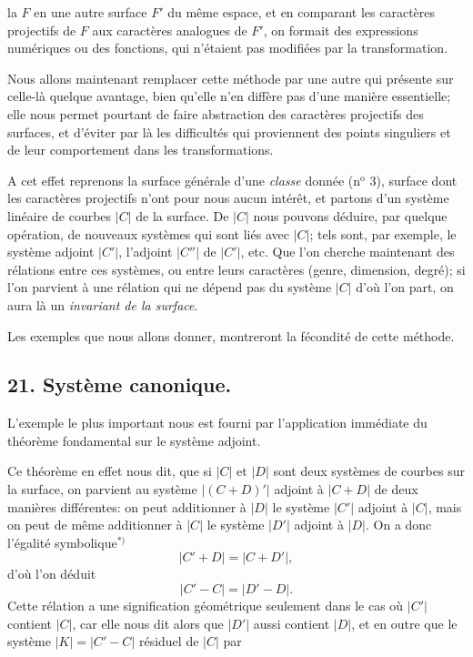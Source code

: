 \documentclass{article}
\begin{document}
la $F$ en une autre surface $F'$ du même espace, et en comparant les caractères projectifs de $F$ aux caractères analogues de $F'$, on formait des expressions numériques ou des fonctions, qui n'étaient pas modifiées par la transformation.

Nous allons maintenant remplacer cette méthode par une autre qui présente sur celle-là quelque avantage, bien qu'elle n'en diffère pas d'une manière essentielle; elle nous permet pourtant de faire abstraction des caractères projectifs des surfaces, et d'éviter par là les difficultés qui proviennent des points singuliers et de leur comportement dans les transformations.

A cet effet reprenons la surface générale d'une \emph{classe} donnée (n${}^{\text{o}}$ 3), surface dont les caractères projectifs n'ont pour nous aucun intérêt, et partons d'un système linéaire de courbes $|C|$ de la surface. De $|C|$ nous pouvons déduire, par quelque opération, de nouveaux systèmes qui sont liés avec $|C|$; tels sont, par exemple, le système adjoint $|C'|$, l'adjoint $|C''|$ de $|C'|$, etc. Que l'on cherche maintenant des rélations entre ces systèmes, ou entre leurs caractères (genre, dimension, degré); si l'on parvient à une rélation qui ne dépend pas du système $|C|$ d'où l'on part, on aura là un \emph{invariant de la surface}.

Les exemples que nous allons donner, montreront la fécondité de cette méthode.

\subsection*{21. Système canonique.}

L'exemple le plus important nous est fourni par l'application immédiate du théorème fondamental sur le système adjoint.

Ce théorème en effet nous dit, que si $|C|$ et $|D|$ sont deux systèmes de courbes sur la surface, on parvient au système $|(C+D)'|$ adjoint à $|C+D|$ de deux manières différentes: on peut additionner à $|D|$ le système $|C'|$ adjoint à $|C|$, mais on peut de même additionner à $|C|$ le système $|D'|$ adjoint à $|D|$. On a donc l'égalité symbolique${}^{*)}$
\[ |C'+D| = |C+D'|, \]
d'où l'on déduit
\[ |C'-C| = |D'-D|. \]
Cette rélation a une signification géométrique seulement dans le cas où $|C'|$ contient $|C|$, car elle nous dit alors que $|D'|$ aussi contient $|D|$, et en outre que le système $|K| = |C'-C|$ résiduel de $|C|$ par
\end{document}
